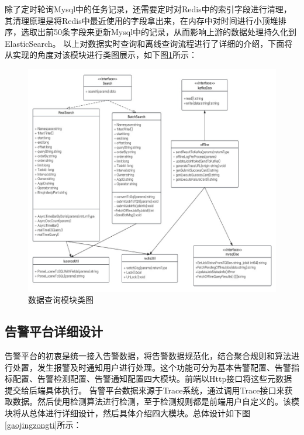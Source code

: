 除了定时轮询Mysql中的任务记录，还需要定时对Redis中的索引字段进行清理，其清理原理是将Redis中最近使用的字段拿出来，在内存中对时间进行小顶堆排序，选取出前50条字段来更新Mysql中的记录，从而影响上游的数据处理持久化到ElasticSearch。
以上对数据实时查询和离线查询流程进行了详细的介绍，下面将从实现的角度对该模块进行类图展示，如下图\ref{chaxunclass}所示：

    \begin{figure}[htb]
  \centering
  \includegraphics[width=5in]{figure/chapter4/数据查询模块类图.jpg}
  \caption{数据查询模块类图}\label{chaxunclass}
\end{figure}

\subsection{告警平台详细设计}

告警平台的初衷是统一接入告警数据，将告警数据规范化，结合聚合规则和算法进行处置，发生报警及时通知用户进行处理。这个功能可分为基本告警配置、告警指标配置、告警检测配置、告警通知配置四大模块。前端以Http接口将这些元数据提交给后端具体执行。
告警平台数据来源于Trace系统，通过调用Trace接口来获取数据。然后使用检测算法进行检测，至于检测规则都是前端用户自定义的。该模块将从总体进行详细设计，然后具体介绍四大模块。总体设计如下图\ref{gaojingzongti}所示：

